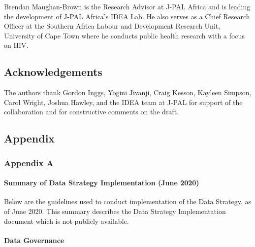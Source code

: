 \documentclass[
]{WileySix}
\begin{document}
Brendan Maughan-Brown is the Research Advisor at J-PAL Africa and is leading the development of J-PAL Africa's IDEA Lab. He also serves as a Chief Research Officer at the Southern Africa Labour and Development Research Unit, University of Cape Town where he conducts public health research with a focus on HIV.

\hypertarget{acknowledgements-3}{%
\subsection*{Acknowledgements}\label{acknowledgements-3}}

The authors thank Gordon Inggs, Yogini Jivanji, Craig Kesson, Kayleen Simpson, Carol Wright, Joshua Hawley, and the IDEA team at J-PAL for support of the collaboration and for constructive comments on the draft.

\hypertarget{appendix-6}{%
\subsection*{Appendix}\label{appendix-6}}

\hypertarget{appendix-a-3}{%
\subsubsection*{Appendix A}\label{appendix-a-3}}

\hypertarget{summary-of-data-strategy-implementation-june-2020}{%
\paragraph{Summary of Data Strategy Implementation (June 2020)}\label{summary-of-data-strategy-implementation-june-2020}}

Below are the guidelines used to conduct implementation of the Data Strategy, as of June 2020. This summary describes the Data Strategy Implementation document which is not publicly available.

\hypertarget{data-governance}{%
\paragraph{Data Governance}\label{data-governance}}
\end{document}
